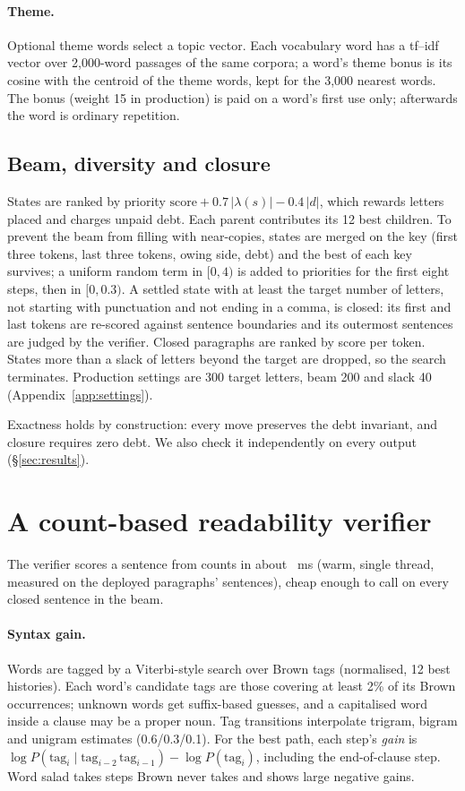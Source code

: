\documentclass[11pt]{article}
\begin{document}
\paragraph{Theme.} Optional theme words select a topic vector. Each vocabulary word has a tf--idf vector over 2,000-word passages of the same corpora; a word's theme bonus is its cosine with the centroid of the theme words, kept for the 3,000 nearest words. The bonus (weight 15 in production) is paid on a word's first use only; afterwards the word is ordinary repetition.

\subsection{Beam, diversity and closure}
States are ranked by priority $\text{score} + 0.7\,|\lambda(s)| - 0.4\,|d|$, which rewards letters placed and charges unpaid debt. Each parent contributes its 12 best children. To prevent the beam from filling with near-copies, states are merged on the key (first three tokens, last three tokens, owing side, debt) and the best of each key survives; a uniform random term in $[0, 4)$ is added to priorities for the first eight steps, then in $[0, 0.3)$. A settled state with at least the target number of letters, not starting with punctuation and not ending in a comma, is closed: its first and last tokens are re-scored against sentence boundaries and its outermost sentences are judged by the verifier. Closed paragraphs are ranked by score per token. States more than a slack of letters beyond the target are dropped, so the search terminates. Production settings are 300 target letters, beam 200 and slack 40 (Appendix~\ref{app:settings}).

Exactness holds by construction: every move preserves the debt invariant, and closure requires zero debt. We also check it independently on every output (\S\ref{sec:results}).

\section{A count-based readability verifier}\label{sec:verifier}

The verifier scores a sentence from counts in about \verifierMs{}~ms (warm, single thread, measured on the \vFiveLiveN{} deployed paragraphs' sentences), cheap enough to call on every closed sentence in the beam.

\paragraph{Syntax gain.} Words are tagged by a Viterbi-style search over Brown tags (normalised, 12 best histories). Each word's candidate tags are those covering at least 2\% of its Brown occurrences; unknown words get suffix-based guesses, and a capitalised word inside a clause may be a proper noun. Tag transitions interpolate trigram, bigram and unigram estimates (0.6/0.3/0.1). For the best path, each step's \emph{gain} is $\log P(\text{tag}_i \mid \text{tag}_{i-2}\,\text{tag}_{i-1}) - \log P(\text{tag}_i)$, including the end-of-clause step. Word salad takes steps Brown never takes and shows large negative gains.
\end{document}

